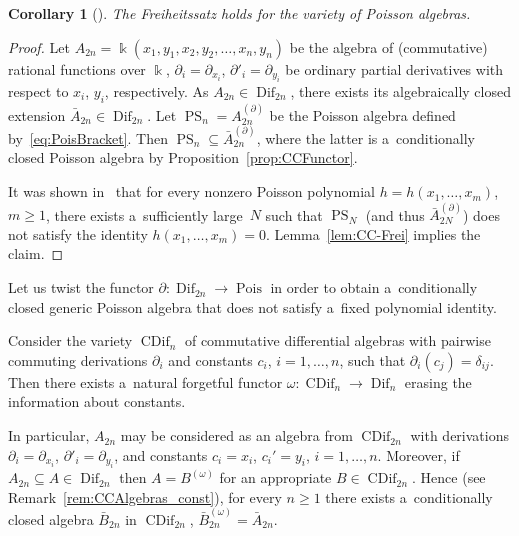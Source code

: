 \documentclass[11pt]{article}
\newtheorem{corollary}{Corollary}
\begin{document}
\begin{corollary}[\cite{MLU10}]
The Freiheitssatz holds for the variety of Poisson algebras.
\end{corollary}

\begin{proof}
Let $A_{2n} = \Bbbk(x_1,y_1, x_2,y_2, \dots,x_n, y_n)$ be the algebra of (commutative) rational functions over $\Bbbk$,
$\partial_i= \partial_{x_i}$, $\partial'_i=\partial_{y_i}$ be ordinary partial derivatives with respect to $x_i$, $y_i$,
respectively.
As $A_{2n}\in \operatorname{Dif}_{2n}$, there exists its algebraically closed extension $\bar A_{2n} \in \operatorname{Dif}_{2n}$.
Let $\operatorname{PS}_n = A_{2n}^{(\partial)}$ be the Poisson algebra def\/ined by~\eqref{eq:PoisBracket}.
Then $\operatorname{PS}_n \subseteq \bar A_{2n}^{(\partial)}$, where the latter is a~conditionally closed Poisson algebra by Proposition~\ref{prop:CCFunctor}.

It was shown in~\cite{FarkasI} that for every nonzero Poisson polynomial $h=h(x_1,\dots, x_m)$, $m\ge 1$, there exists
a~suf\/f\/iciently large~$N$ such that $\operatorname{PS}_N$ (and thus $\bar A_{2N}^{(\partial)}$) does not satisfy the identity
$h(x_1,\dots, x_m)=0$.
Lemma~\ref{lem:CC-Frei} implies the claim.
\end{proof}

Let us twist the functor $\partial: \operatorname{Dif}_{2n}\to \operatorname{Pois}$ in order to obtain a~conditionally closed generic Poisson algebra
that does not satisfy a~f\/ixed polynomial identity.

Consider the variety $\operatorname{CDif}_{n}$ of commutative dif\/ferential algebras with pairwise commuting derivations $\partial_i$
and constants $c_i$, $i=1,\dots, n$, such that $\partial_i(c_j)=\delta_{ij}$.
Then there exists a~natural forgetful functor $\omega: \operatorname{CDif}_n\to \operatorname{Dif}_n$ erasing the information about constants.

In particular, $A_{2n}$ may be considered as an algebra from $\operatorname{CDif}_{2n}$ with derivations $\partial_i=\partial_{x_i}$,
$\partial'_i=\partial_{y_i}$, and constants $c_i=x_i$, $c_i'=y_i$, $i=1,\dots, n$.
Moreover, if $A_{2n}\subseteq A\in \operatorname{Dif}_{2n}$ then $A=B^{(\omega)}$ for an appropriate $B\in \operatorname{CDif}_{2n}$.
Hence (see Remark~\ref{rem:CCAlgebras_const}), for every $n\ge 1$ there exists a~conditionally closed algebra $\bar
B_{2n}$ in $\operatorname{CDif}_{2n}$, $\bar B_{2n}^{(\omega)}=\bar A_{2n}$.
\end{document}
